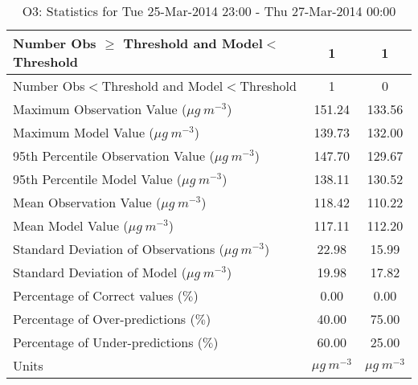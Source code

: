 \begin{table}
\begin{center}
\begin{tabular}{|l|c|c|}
 Number Obs $\geq$ Threshold and Model$<$Threshold &         1 &         1 \\  \hline
 Number Obs$<$Threshold and Model$<$Threshold  &         1 &         0 \\  \hline
 Maximum Observation Value ($\mu g\ m^{-3}$)   &    151.24 &    133.56 \\  \hline
 Maximum Model Value ($\mu g\ m^{-3}$)         &    139.73 &    132.00 \\  \hline
 95th Percentile Observation Value ($\mu g\ m^{-3}$) &    147.70 &    129.67 \\  \hline
 95th Percentile Model Value ($\mu g\ m^{-3}$) &    138.11 &    130.52 \\  \hline
 Mean Observation Value ($\mu g\ m^{-3}$)      &    118.42 &    110.22 \\  \hline
 Mean Model Value ($\mu g\ m^{-3}$)            &    117.11 &    112.20 \\  \hline
 Standard Deviation of Observations ($\mu g\ m^{-3}$) &     22.98 &     15.99 \\  \hline
 Standard Deviation of Model ($\mu g\ m^{-3}$) &     19.98 &     17.82 \\  \hline
 Percentage of Correct values ($\%$)           &      0.00 &      0.00 \\  \hline
 Percentage of Over-predictions ($\%$)         &     40.00 &     75.00 \\  \hline
 Percentage of Under-predictions ($\%$)        &     60.00 &     25.00 \\  \hline
 Units                                         &    $\mu g\ m^{-3}$ &    $\mu g\ m^{-3}$ \\  \hline
    \end{tabular}
    \caption{O3: Statistics for Tue 25-Mar-2014 23:00 - Thu 27-Mar-2014 00:00}
    \label{StatsO3}
  \end{center}
\end{table}

